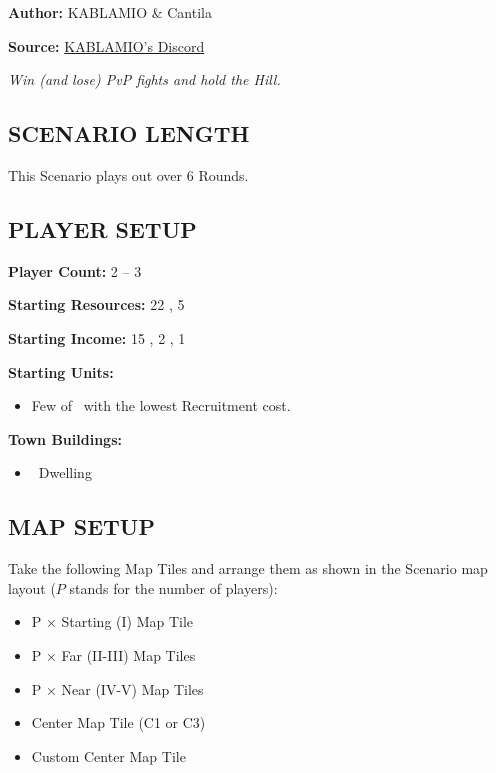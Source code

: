 
\begin{multicols*}{2}

\textbf{Author:} KABLAMIO \& Cantila

\textbf{Source:} \href{https://discord.com/channels/1275490124301467799/1284428969369665631}{KABLAMIO's Discord}

\textit{Win (and lose) PvP fights and hold the Hill.}

\subsection*{\MakeUppercase{Scenario Length}}
This Scenario plays out over 6 Rounds.

\subsection*{\MakeUppercase{Player Setup}}
\textbf{Player Count:} 2 -- 3

\textbf{Starting Resources:} 22 , 5 

\textbf{Starting Income:} 15 , 2 , 1 

\textbf{Starting Units:}
\begin{itemize}
  \item Few of \silver\ with the lowest Recruitment cost.
\end{itemize}

\textbf{Town Buildings:}
\begin{itemize}
  \item \bronze\ Dwelling
\end{itemize}

\subsection*{\MakeUppercase{Map Setup}}
Take the following Map Tiles and arrange them as shown in the Scenario map layout ($P$ stands for the number of players):

\begin{itemize}
  \item P × Starting (I) Map Tile
  \item P × Far (II-III) Map Tiles
  \item P × Near (IV-V) Map Tiles
  \item Center Map Tile (C1 or C3)
  \item Custom Center Map Tile
\end{itemize}


\end{multicols*}
